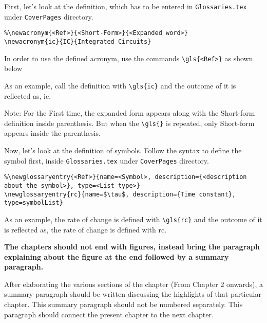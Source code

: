 First, let's look at the definition, which has to be entered in \texttt{Glossaries.tex} under \texttt{CoverPages} directory.
\begin{verbatim}
%\newacronym{<Ref>}{<Short-Form>}{<Expanded word>}
\newacronym{ic}{IC}{Integrated Circuits}
\end{verbatim}
In order to use the defined acronym, use the commands \verb|\gls{<Ref>}| as shown below

As an example, call the definition with \verb|\gls{ic}| and the outcome of it is reflected as, \gls{ic}.

Note: For the First time, the expanded form appears along with the Short-form definition inside parenthesis. But when the \verb|\gls{}| is repeated, only Short-form appears inside the parenthesis.

Now, let's look at the definition of symbols. Follow the syntax to define the symbol first, inside \texttt{Glossaries.tex} under \texttt{CoverPages} directory.
\begin{verbatim}
%\newglossaryentry{<Ref>}{name=<Symbol>, description={<description about the symbol>}, type=<List type>}
\newglossaryentry{rc}{name=$\tau$, description={Time constant}, type=symbolList}
\end{verbatim}

As an example, the rate of change is defined with \verb|\gls{rc}| and the outcome of it is reflected as, the rate of change is defined with \gls{rc}.

\vspace{0.75cm}

 \textbf{The chapters should not end with figures, instead bring the paragraph explaining about the figure at the end followed by a summary paragraph.}

After elaborating the various sections of the chapter (From Chapter 2 onwards), a summary paragraph should be written discussing the highlights of that particular chapter. This summary paragraph should not be numbered separately. This paragraph should connect the present chapter to the next chapter.
